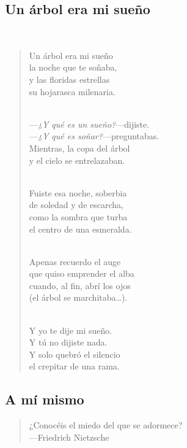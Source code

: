 \documentclass[a4paper, 12pt]{article}
\begin{document}
\pagebreak
\subsection{Un árbol era mi sueño}
~

\begin{verse}
Un árbol era mi sueño\\
la noche que te soñaba,\\
y las floridas estrellas\\
su hojarasca milenaria.\\
~ 

—\textit{¿Y qué es un sueño?}—dijiste.\\
—\textit{¿Y qué es soñar?}—preguntabas.\\
Mientras, la copa del árbol\\
y el cielo se entrelazaban.\\
~ 

Fuiste esa noche, soberbia\\
de soledad y de escarcha,\\
como la sombra que turba\\
el centro de una esmeralda.\\
~ 

Apenas recuerdo el auge\\
que quiso emprender el alba\\
cuando, al fin, abrí los ojos\\
(el árbol se marchitaba…).\\
~ 

Y yo te dije mi sueño.\\
Y tú no dijiste nada.\\
Y solo quebró el silencio\\
el crepitar de una rama.\\
\end{verse}

\pagebreak 

\subsection{A mí mismo}

\scriptsize
\begin{quote}
    \hspace*{\fill}¿Conocéis el miedo del que se adormece?\\
\hspace*{\fill}—Friedrich Nietzsche
\end{quote}
\normalsize
~
\end{document}
